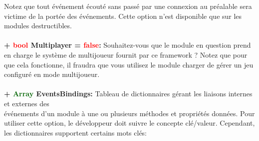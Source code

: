 \documentclass[a4paper, 11pt]{article}
\begin{document}
	Notez que tout événement écouté sans passé par une connexion au préalable sera victime de la portée des
	événements. Cette option n'est disponible que sur les modules destructibles.\\\\
	\textbf{+ \textcolor{red}{bool} Multiplayer = \textcolor{red}{false}:} Souhaitez-vous que le module en 
	question prend en charge le système de multijoueur fournit par ce framework ? Notez que pour que cela 
	fonctionne, il fraudra que vous utilisez le module charger de gérer un jeu configuré en mode 
	multijoueur.\\\\
	\textbf{+ \textcolor{darkgreen}{Array} EventsBindings:} Tableau de dictionnaires gérant les liaisons
	internes et externes des \\événements d'un module à une ou plusieurs méthodes et propriétés données.
	Pour utiliser cette option, le développeur doit suivre le concepte clé/valeur. Cependant, les
	dictionnaires supportent certains mots clés:
\end{document}
